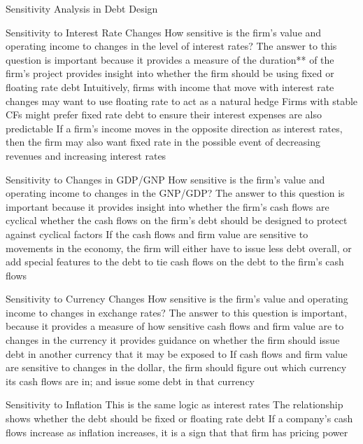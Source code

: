 \documentclass[10pt]{article}
\begin{document}
    \begin{core}{Sensitivity Analysis in Debt Design}

      Sensitivity to Interest Rate Changes
      How sensitive is the firm’s value and operating income to changes in the level of interest rates?
      The answer to this question is important because it
      provides a measure of the duration** of the firm’s project
      provides insight into whether the firm should be using fixed or floating rate debt
      Intuitively, firms with income that move with interest rate changes may want to use floating rate to act as a natural hedge
      Firms with stable CFs might prefer fixed rate debt to ensure their interest expenses are also predictable
      If a firm’s income moves in the opposite direction as interest rates, then the firm may also want fixed rate in the possible event of decreasing revenues and increasing interest rates

      Sensitivity to Changes in GDP/GNP
      How sensitive is the firm’s value and operating income to changes in the GNP/GDP?
      The answer to this question is important because
      it provides insight into whether the firm’s cash flows are cyclical
      whether the cash flows on the firm's debt should be designed to protect against cyclical factors
      If the cash flows and firm value are sensitive to movements in the economy, the firm will either have to issue less debt overall, or add special features to the debt to tie cash flows on the debt to the firm’s cash flows

      Sensitivity to Currency Changes
      How sensitive is the firm’s value and operating income to changes in exchange rates?
      The answer to this question is important, because
      it provides a measure of how sensitive cash flows and firm value are to changes in the currency
      it provides guidance on whether the firm should issue debt in another currency that it may be exposed to
      If cash flows and firm value are sensitive to changes in the dollar, the firm should
      figure out which currency its cash flows are in;
      and issue some debt in that currency

      Sensitivity to Inflation
      This is the same logic as interest rates
      The relationship shows whether the debt should be fixed or floating rate debt
      If a company’s cash flows increase as inflation increases, it is a sign that that firm has pricing power

    \end{core}
\end{document}
